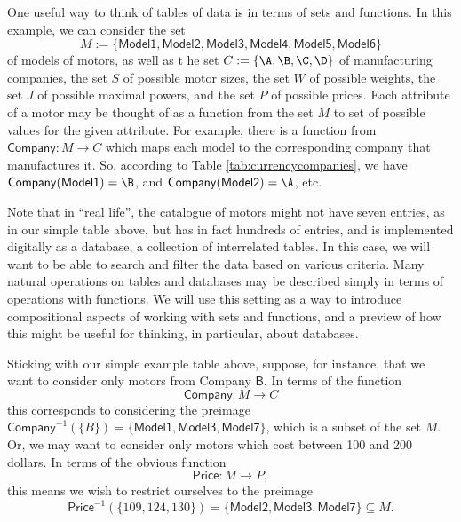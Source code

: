 One useful way to think of tables of data is in terms of sets and functions. In this example, we can consider the set
$$
M := \{ \mathsf{Model1}, \mathsf{Model2}, \mathsf{Model3}, \mathsf{Model4}, \mathsf{Model5}, \mathsf{Model6} \}
$$ 
of models of motors, as well as t he set $C := \{ \A, \B, \C, \D \}$ of manufacturing companies, the set $S$ of possible motor sizes, the set $W$ of possible weights, the set $J$ of possible maximal powers, and the set $P$ of possible prices. Each attribute of a motor may be thought of as a function from the set $M$ to set of possible values for the given attribute. For example, there is a function from $\mathsf{Company}: M \longrightarrow C$ which maps each model to the corresponding company that manufactures it. So, according to Table \ref{tab:currencycompanies}, we have  $\mathsf{Company}(\mathsf{Model1}) = \B$, and $\mathsf{Company}(\mathsf{Model2}) = \A$, etc.

Note that in ``real life'', the catalogue of motors might not have seven entries, as in our simple table above, but has in fact hundreds of entries, and is implemented digitally as a database,  a collection of interrelated tables. In this case, we will want to be able to search and filter the data based on various criteria. Many natural operations on tables and databases may be described simply in terms of operations with functions. We will use this setting as a way to introduce compositional aspects of working with sets and functions, and a preview of how this might be useful for thinking, in particular, about databases. 

Sticking with our simple example table above, suppose, for instance, that we want to consider only motors from Company $\mathsf{B}$. In terms of the function
$$
\mathsf{Company}: M \longrightarrow C
$$
this corresponds to considering the preimage $\mathsf{Company}^{-1}(\{ B \}) = \{ \mathsf{Model1}, \mathsf{Model3}, \mathsf{Model7} \}$, which is a subset of the set $M$. Or, we may want to consider only motors which cost between 100 and 200 dollars. In terms of the obvious function
$$
\mathsf{Price}: M \longrightarrow P,
$$
this means we wish to restrict ourselves to the preimage 
$$
\mathsf{Price}^{-1}(\{ 109, 124, 130\}) = \{ \mathsf{Model2}, \mathsf{Model3}, \mathsf{Model7} \} \subseteq M.
$$

